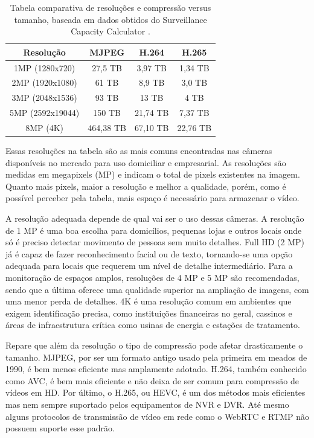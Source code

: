 \documentclass[12pt, %
openright, 
oneside, %
a4paper,    %
brazil]{facom-ufu-abntex2}
\begin{document}
\begin{table}[ht]
	\centering
	\begin{tabular}{|c|c|c|c|}
		\hline
		Resolução         & MJPEG     & H.264    & H.265    \\ \hline
		1MP (1280x720)    & 27,5 TB   & 3,97 TB  & 1,34 TB  \\ \hline
		2MP  (1920x1080)  & 61 TB     & 8,9 TB   & 3,0 TB   \\ \hline
		3MP  (2048x1536)  & 93 TB     & 13 TB    & 4 TB     \\ \hline
		5MP  (2592x19044) & 150 TB    & 21,74 TB & 7,37 TB  \\ \hline
		8MP  (4K)         & 464,38 TB & 67,10 TB & 22,76 TB \\ \hline

	\end{tabular}
	\caption{Tabela comparativa de resoluções e compressão versus tamanho,
		baseada em dados obtidos do Surveillance Capacity Calculator
		\cite{surveillancecalculator}.}
	\label{table:example}
\end{table}

Essas resoluções na tabela são as mais comuns encontradas nas câmeras
disponíveis no mercado para uso domiciliar e empresarial. As resoluções são
medidas em megapixels (MP) e indicam o total de pixels existentes na imagem.
Quanto mais pixels, maior a resolução e melhor a qualidade, porém, como é
possível perceber pela tabela, mais espaço é necessário para armazenar o vídeo.

A resolução adequada depende de qual vai ser o uso dessas câmeras. A resolução
de 1 MP é uma boa escolha para domicílios, pequenas lojas e outros locais onde
só é preciso detectar movimento de pessoas sem muito detalhes. Full HD (2 MP)
já é capaz de fazer reconhecimento facial ou de texto, tornando-se uma opção
adequada para locais que requerem um nível de detalhe intermediário. Para a
monitoração de espaços amplos, resoluções de 4 MP e 5 MP são recomendadas,
sendo que a última oferece uma qualidade superior na ampliação de imagens, com
uma menor perda de detalhes. 4K é uma resolução comum em ambientes que exigem
identificação precisa, como instituições financeiras no geral, cassinos e áreas
de infraestrutura crítica como usinas de energia e estações de tratamento.

Repare que além da resolução o tipo de compressão pode afetar drasticamente o
tamanho. MJPEG, por ser um formato antigo usado pela primeira em meados de
1990, é bem menos eficiente mas amplamente adotado. H.264, também conhecido
como AVC, é bem mais eficiente e não deixa de ser comum para compressão de
vídeos em HD. Por último, o H.265, ou HEVC, é um dos métodos mais eficientes
mas nem sempre suportado pelos equipamentos de NVR e DVR. Até mesmo alguns
protocolos de transmissão de vídeo em rede como o WebRTC e RTMP não possuem
suporte esse padrão.
\end{document}
